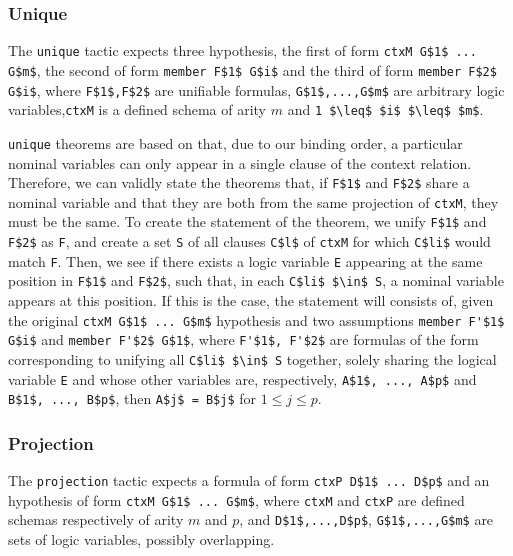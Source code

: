 \documentclass[nocopyrightspace,authoryear]{sigplanconf}
\begin{document}
\subsubsection{Unique}
The \lstinline|unique| tactic expects three hypothesis, the first of form \lstinline|ctxM G$1$ ... G$m$|, the second of form \lstinline|member F$1$ G$i$| and the third of form \lstinline|member F$2$ G$i$|, where \lstinline|F$1$,F$2$| are unifiable formulas, \lstinline|G$1$,...,G$m$| are arbitrary logic variables,\lstinline|ctxM| is a defined schema of arity $m$ and \lstinline|1 $\leq$ $i$ $\leq$ $m$|.

\lstinline|unique| theorems are based on that, due to our binding order, a particular nominal variables can only appear in a single clause of the context relation. Therefore, we can validly state the theorems that, if \lstinline|F$1$| and \lstinline|F$2$| share a nominal variable and that they are both from the same projection of \lstinline|ctxM|, they must be the same. To create the statement of the theorem, we unify \lstinline|F$1$| and \lstinline|F$2$| as \lstinline|F|, and create a set \lstinline|S| of all clauses \lstinline|C$l$| of \lstinline|ctxM| for which \lstinline|C$li$| would match \lstinline|F|. Then, we see if there exists a logic variable \lstinline|E| appearing at the same position in \lstinline|F$1$| and \lstinline|F$2$|, such that, in each \lstinline|C$li$ $\in$ S|, a nominal variable appears at this position. If this is the case, the statement will consists of, given the original \lstinline|ctxM G$1$ ... G$m$| hypothesis and two assumptions \lstinline|member F'$1$ G$i$| and \lstinline|member F'$2$ G$1$|, where \lstinline|F'$1$, F'$2$| are formulas of the form corresponding to unifying all \lstinline|C$li$ $\in$ S| together, solely sharing the logical variable \lstinline|E| and whose other variables are, respectively, \lstinline|A$1$, ..., A$p$| and \lstinline|B$1$, ..., B$p$|, then \lstinline|A$j$ = B$j$| for $1 \leq j \leq p$.



\subsubsection{Projection}
The \lstinline|projection| tactic expects a formula of form \lstinline|ctxP D$1$ ... D$p$| and an hypothesis of form \lstinline|ctxM G$1$ ... G$m$|, where \lstinline|ctxM| and \lstinline|ctxP| are defined schemas respectively of arity $m$ and $p$, and \lstinline|D$1$,...,D$p$|, \lstinline|G$1$,...,G$m$| are sets of logic variables, possibly overlapping.
\end{document}
